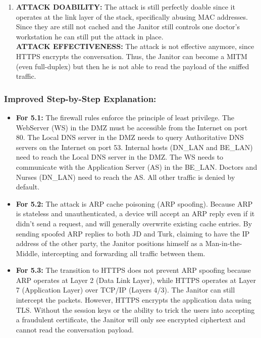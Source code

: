 \documentclass{article}
\begin{document}
\begin{enumerate}
    \item[\textbf{5.3}] \textbf{ATTACK DOABILITY:} The attack is still perfectly doable since it operates at the link layer of the stack, specifically abusing MAC addresses. Since they are still not cached and the Janitor still controls one doctor's workstation he can still put the attack in place. \\
    \textbf{ATTACK EFFECTIVENESS:} The attack is not effective anymore, since HTTPS encrypts the conversation. Thus, the Janitor can become a MITM (even full-duplex) but then he is not able to read the payload of the sniffed traffic.
\end{enumerate}

\subsubsection*{Improved Step-by-Step Explanation:}
\begin{itemize}
    \item \textbf{For 5.1:} The firewall rules enforce the principle of least privilege. The WebServer (WS) in the DMZ must be accessible from the Internet on port 80. The Local DNS server in the DMZ needs to query Authoritative DNS servers on the Internet on port 53. Internal hosts (DN\_LAN and BE\_LAN) need to reach the Local DNS server in the DMZ. The WS needs to communicate with the Application Server (AS) in the BE\_LAN. Doctors and Nurses (DN\_LAN) need to reach the AS. All other traffic is denied by default.
    \item \textbf{For 5.2:} The attack is ARP cache poisoning (ARP spoofing). Because ARP is stateless and unauthenticated, a device will accept an ARP reply even if it didn't send a request, and will generally overwrite existing cache entries. By sending spoofed ARP replies to both JD and Turk, claiming to have the IP address of the other party, the Janitor positions himself as a Man-in-the-Middle, intercepting and forwarding all traffic between them.
    \item \textbf{For 5.3:} The transition to HTTPS does not prevent ARP spoofing because ARP operates at Layer 2 (Data Link Layer), while HTTPS operates at Layer 7 (Application Layer) over TCP/IP (Layers 4/3). The Janitor can still intercept the packets. However, HTTPS encrypts the application data using TLS. Without the session keys or the ability to trick the users into accepting a fraudulent certificate, the Janitor will only see encrypted ciphertext and cannot read the conversation payload.
\end{itemize}
\end{document}
